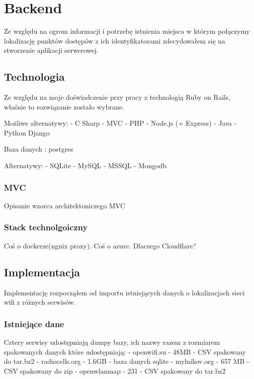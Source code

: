 \chapter{Backend}

Ze względu na ogrom informacji i potrzebę istnienia miejsca w którym połączymy lokalizację punktów dostępów z ich identyfikatorami zdecydowałem się na stworzenie aplikacji serwerowej. 

\section{Technologia}

Ze względu na moje doświadczenie przy pracy z technologią Ruby on Rails, właśnie to rozwiązanie zostało wybrane.

Możliwe alternatywy:
 - C Sharp - MVC
 - PHP
 - Node.js (+ Express)
 - Java
 - Python Django

Baza danych : postgres

Alternatywy:
 - SQLite
 - MySQL
 - MSSQL
 - Mongodb
 
 
\subsection{MVC}
Opisanie wzorca architektoniczego MVC

\subsection{Stack technolgoiczny}
Coś o dockerze(ngnix proxy). Coś o azure. Dlaczego Cloudflare?



\section{Implementacja}

Implementację rozpocząłem od importu istniejących danych o lokalizacjach sieci wifi z różnych serwisów.

\subsection{Istniejące dane}

Cztery serwisy udostępniają dumpy bazy, ich nazwy razem z rozmiarem spakowanych danych które udostępniają:
 - openwifi.su - 48MB - CSV spakowany do tar.bz2
 - radiocells.org - 1.6GB - baza danych sqlite
 - mylnikov.org - 657 MB - CSV spakowany do zip
 - openwlanmap - 231 - CSV spakowany do tar.bz2

